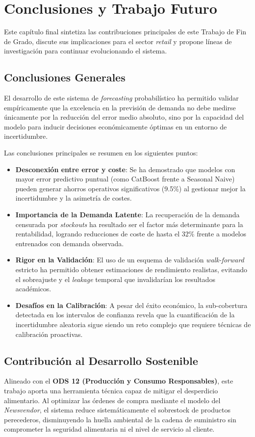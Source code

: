 \chapter{Conclusiones y Trabajo Futuro}
\label{chap:conclusiones}

Este capítulo final sintetiza las contribuciones principales de este Trabajo de Fin de Grado, discute sus implicaciones para el sector \textit{retail} y propone líneas de investigación para continuar evolucionando el sistema.

\section{Conclusiones Generales}
El desarrollo de este sistema de \textit{forecasting} probabilístico ha permitido validar empíricamente que la excelencia en la previsión de demanda no debe medirse únicamente por la reducción del error medio absoluto, sino por la capacidad del modelo para inducir decisiones económicamente óptimas en un entorno de incertidumbre.

Las conclusiones principales se resumen en los siguientes puntos:
\begin{itemize}
    \item \textbf{Desconexión entre error y coste}: Se ha demostrado que modelos con mayor error predictivo puntual (como CatBoost frente a Seasonal Naive) pueden generar ahorros operativos significativos (9.5\%) al gestionar mejor la incertidumbre y la asimetría de costes.
    \item \textbf{Importancia de la Demanda Latente}: La recuperación de la demanda censurada por \textit{stockouts} ha resultado ser el factor más determinante para la rentabilidad, logrando reducciones de coste de hasta el 32\% frente a modelos entrenados con demanda observada.
    \item \textbf{Rigor en la Validación}: El uso de un esquema de validación \textit{walk-forward} estricto ha permitido obtener estimaciones de rendimiento realistas, evitando el sobreajuste y el \textit{leakage} temporal que invalidarían los resultados académicos.
    \item \textbf{Desafíos en la Calibración}: A pesar del éxito económico, la sub-cobertura detectada en los intervalos de confianza revela que la cuantificación de la incertidumbre aleatoria sigue siendo un reto complejo que requiere técnicas de calibración proactivas.
\end{itemize}

\section{Contribución al Desarrollo Sostenible}
Alineado con el \textbf{ODS 12 (Producción y Consumo Responsables)}, este trabajo aporta una herramienta técnica capaz de mitigar el desperdicio alimentario. Al optimizar las órdenes de compra mediante el modelo del \textit{Newsvendor}, el sistema reduce sistemáticamente el sobrestock de productos perecederos, disminuyendo la huella ambiental de la cadena de suministro sin comprometer la seguridad alimentaria ni el nivel de servicio al cliente.

